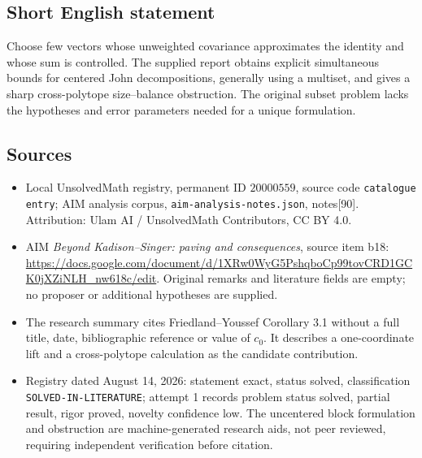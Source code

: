 \documentclass[11pt]{article}
\begin{document}
\subsection{Short English statement}
Choose few vectors whose unweighted covariance approximates the identity and whose sum is controlled. The supplied report obtains explicit simultaneous bounds for centered John decompositions, generally using a multiset, and gives a sharp cross-polytope size--balance obstruction. The original subset problem lacks the hypotheses and error parameters needed for a unique formulation.
\subsection{Sources}
\begin{itemize}
\item Local UnsolvedMath registry, permanent ID \(20000559\), source code \texttt{catalogue entry}; AIM analysis corpus, \texttt{aim-analysis-notes.json}, notes[90]. Attribution: Ulam AI / UnsolvedMath Contributors, CC BY 4.0.
\item AIM \emph{Beyond Kadison--Singer: paving and consequences}, source item b18: \url{https://docs.google.com/document/d/1XRw0WyG5PshqboCp99tovCRD1GCK0jXZiNLH_nw618c/edit}. Original remarks and literature fields are empty; no proposer or additional hypotheses are supplied.
\item The research summary cites Friedland--Youssef Corollary 3.1 without a full title, date, bibliographic reference or value of \(c_0\). It describes a one-coordinate lift and a cross-polytope calculation as the candidate contribution.
\item Registry dated August 14, 2026: statement exact, status solved, classification \texttt{SOLVED-IN-LITERATURE}; attempt 1 records problem status solved, partial result, rigor proved, novelty confidence low. The uncentered block formulation and obstruction are machine-generated research aids, not peer reviewed, requiring independent verification before citation.
\end{itemize}
\end{document}
